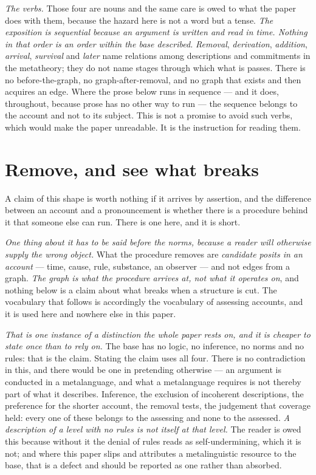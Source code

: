\documentclass[11pt,a4paper]{article}
\theoremstyle{remark}\newtheorem{remark}[proposition]{Remark}
\begin{document}
\emph{The verbs.} Those four are nouns and the same care is owed to what the paper does with them,
because the hazard here is not a word but a tense. \emph{The exposition is sequential because an
argument is written and read in time. Nothing in that order is an order within the base described.}
\emph{Removal}, \emph{derivation}, \emph{addition}, \emph{arrival}, \emph{survival} and \emph{later}
name relations among descriptions and commitments in the metatheory; they do not name stages through
which what is passes. There is no before-the-graph, no graph-after-removal, and no graph that exists
and then acquires an edge. Where the prose below runs in sequence --- and it does, throughout, because
prose has no other way to run --- the sequence belongs to the account and not to its subject. This is
not a promise to avoid such verbs, which would make the paper unreadable. It is the instruction for
reading them.

\section{Remove, and see what breaks}\label{sec:method}
A claim of this shape is worth nothing if it arrives by assertion, and the difference between an account
and a pronouncement is whether there is a procedure behind it that someone else can run. There is one here, and it is short.

\emph{One thing about it has to be said before the norms, because a reader will otherwise supply the
wrong object.} What the procedure removes are \emph{candidate posits in an account} --- time, cause,
rule, substance, an observer --- and not edges from a graph. \emph{The graph is what the procedure
arrives at, not what it operates on}, and nothing below is a claim about what breaks when a structure
is cut. The vocabulary that follows is accordingly the vocabulary of assessing accounts, and it is used
here and nowhere else in this paper.

\emph{That is one instance of a distinction the whole paper rests on, and it is cheaper to state once
than to rely on.} The base has no logic, no inference, no norms and no rules: that is the claim.
Stating the claim uses all four. There is no contradiction in this, and there would be one in
pretending otherwise --- an argument is conducted in a metalanguage, and what a metalanguage requires
is not thereby part of what it describes. Inference, the exclusion of incoherent descriptions, the
preference for the shorter account, the removal tests, the judgement that coverage held: every one of
these belongs to the assessing and none to the assessed. \emph{A description of a level with no rules
is not itself at that level.} The reader is owed this because without it the denial of rules reads as
self-undermining, which it is not; and where this paper slips and attributes a metalinguistic resource
to the base, that is a defect and should be reported as one rather than absorbed.
\end{document}
